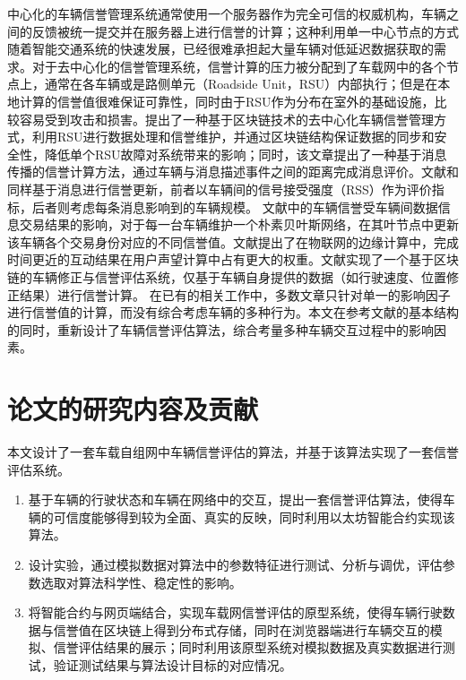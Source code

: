 中心化的车辆信誉管理系统通常使用一个服务器作为完全可信的权威机构，车辆之间的反馈被统一提交并在服务器上进行信誉的计算\cite{reputation}；这种利用单一中心节点的方式随着智能交通系统的快速发展，已经很难承担起大量车辆对低延迟数据获取的需求。对于去中心化的信誉管理系统，信誉计算的压力被分配到了车载网中的各个节点上，通常在各车辆\cite{ephemeral}或是路侧单元（Roadside Unit，RSU）\cite{2017Distributed}内部执行；但是在本地计算的信誉值很难保证可靠性，同时由于RSU作为分布在室外的基础设施，比较容易受到攻击和损害。\cite{2018Blockchain}提出了一种基于区块链技术的去中心化车辆信誉管理方式，利用RSU进行数据处理和信誉维护，并通过区块链结构保证数据的同步和安全性，降低单个RSU故障对系统带来的影响；同时，该文章提出了一种基于消息传播的信誉计算方法，通过车辆与消息描述事件之间的距离完成消息评价。文献\cite{rss}和\cite{density}同样基于消息进行信誉更新，前者以车辆间的信号接受强度（RSS）作为评价指标，后者则考虑每条消息影响到的车辆规模。
文献\cite{v2v}中的车辆信誉受车辆间数据信息交易结果的影响，对于每一台车辆维护一个朴素贝叶斯网络，在其叶节点中更新该车辆各个交易身份对应的不同信誉值。文献\cite{edge}提出了在物联网的边缘计算中，完成时间更近的互动结果在用户声望计算中占有更大的权重。文献\cite{lwq}实现了一个基于区块链的车辆修正与信誉评估系统，仅基于车辆自身提供的数据（如行驶速度、位置修正结果）进行信誉计算。
在已有的相关工作中，多数文章只针对单一的影响因子进行信誉值的计算，而没有综合考虑车辆的多种行为。本文在参考文献\cite{lwq}的基本结构的同时，重新设计了车辆信誉评估算法，综合考量多种车辆交互过程中的影响因素。

\section{论文的研究内容及贡献}

本文设计了一套车载自组网中车辆信誉评估的算法，并基于该算法实现了一套信誉评估系统。

\begin{enumerate}
    \item 基于车辆的行驶状态和车辆在网络中的交互，提出一套信誉评估算法，使得车辆的可信度能够得到较为全面、真实的反映，同时利用以太坊智能合约实现该算法。
    \item 设计实验，通过模拟数据对算法中的参数特征进行测试、分析与调优，评估参数选取对算法科学性、稳定性的影响。
    \item 将智能合约与网页端结合，实现车载网信誉评估的原型系统，使得车辆行驶数据与信誉值在区块链上得到分布式存储，同时在浏览器端进行车辆交互的模拟、信誉评估结果的展示；同时利用该原型系统对模拟数据及真实数据进行测试，验证测试结果与算法设计目标的对应情况。
\end{enumerate}
